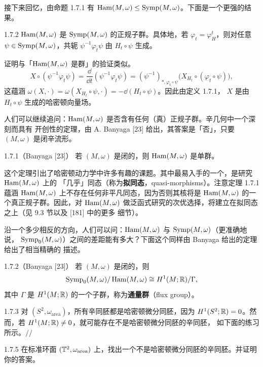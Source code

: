 接下来回忆，由命题 1.7.1 有 $\operatorname{Ham}(M,\omega)\le\operatorname{Symp}(M,\omega)$。下面是一个更强的结果。

\begin{wprop}{1.7.2}
$\operatorname{Ham}(M,\omega)$ 是 $\operatorname{Symp}(M,\omega)$ 的正规子群。具体地，若 $\varphi_t=\varphi_H^t$，则对任意
$\psi\in\operatorname{Symp}(M,\omega)$，共轭 $\psi^{-1}\varphi_t\psi$ 由 $H_t\circ\psi$ 生成。
\end{wprop}

\begin{wproof}
证明与「$\operatorname{Ham}(M,\omega)$ 是群」的验证类似。
\[
  X\circ(\psi^{-1}\varphi_t\psi)
  =\frac{\dd}{\dd t}(\psi^{-1}\varphi_t\psi)
  =(\psi^{-1})_{*,\varphi_t\circ\psi}
  \big(X_{H_t}\circ(\varphi_t\circ\psi)\big),
\]
这蕴涵 $\omega(X,\cdot)=\omega(X_{H_t}\circ\psi,\cdot)=-\dd(H_t\circ\psi)$。因此由定义 1.7.1，
$X$ 是由 $H_t\circ\psi$ 生成的哈密顿向量场。
\end{wproof}

人们可以继续追问：$\operatorname{Ham}(M,\omega)$ 是否含有任何（真）正规子群。辛几何中一个深刻而具有
开创性的定理，由 A. Banyaga [23] 给出，其答案是「否」，只要 $(M,\omega)$ 是闭辛流形。

\begin{wthm}{1.7.1}（Banyaga [23]）
若 $(M,\omega)$ 是闭的，则 $\operatorname{Ham}(M,\omega)$ 是单群。
\end{wthm}

这个定理引出了哈密顿动力学中许多有趣的课题。其中最易入手的一个，是研究 $\operatorname{Ham}(M,\omega)$ 上的
「几乎」同态（称为\textbf{拟同态}，quasi-morphisms）。注意定理 1.7.1 蕴涵 $\operatorname{Ham}(M,\omega)$
上不存在任何非平凡同态，因为否则其核将是 $\operatorname{Ham}(M,\omega)$ 的一个真正规子群。因此，对
$\operatorname{Ham}(M,\omega)$ 做泛函式研究的次优选择，将建立在拟同态之上（见 9.3 节以及 [181] 中的更多
细节）。

沿一个多少相反的方向，人们可以问：$\operatorname{Ham}(M,\omega)$ 与 $\operatorname{Symp}(M,\omega)$（更准确地说，
$\operatorname{Symp}_0(M,\omega)$）之间的差距能有多大？下面这个同样由 Banyaga 给出的定理给出了相当精确的
描述。

\begin{wthm}{1.7.2}（Banyaga [23]）
若 $(M,\omega)$ 是闭的，则
\[
  \operatorname{Symp}_0(M,\omega)/\operatorname{Ham}(M,\omega)\cong H^1(M;\mathbb{R})/\Gamma,
\]
其中 $\Gamma$ 是 $H^1(M;\mathbb{R})$ 的一个子群，称为\textbf{通量群}（flux group）。
\end{wthm}

\begin{wexam}{1.7.3}
对 $(S^2,\omega_{\mathrm{area}})$，所有辛同胚都是哈密顿微分同胚，因为
$H^1(S^2;\mathbb{R})=0$。然而，若 $H^1(M;\mathbb{R})\neq0$，就可能存在不是哈密顿微分同胚的辛同胚，
如下面的练习所示。\hfill$//$
\end{wexam}

\begin{wexer}{1.7.5}
在标准环面 $(\mathbb{T}^2,\omega_{\mathrm{area}})$ 上，找出一个不是哈密顿微分同胚的辛同胚。并证明
你的答案。
\end{wexer}
